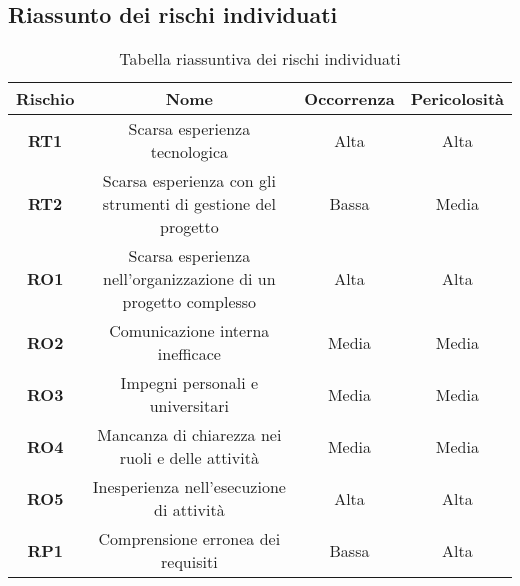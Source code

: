 \subsection{Riassunto dei rischi individuati}
\begin{table}[h]
\centering
\begin{tabular}{|c|c|c|c|}
\hline
\textbf{Rischio} & \textbf{Nome} & \textbf{Occorrenza} & \textbf{Pericolosità} \\
\hline
\textbf{RT1} & Scarsa esperienza tecnologica & Alta & Alta \\
\hline
\textbf{RT2} & Scarsa esperienza con gli strumenti di gestione del progetto & Bassa & Media \\
\hline
\textbf{RO1} & Scarsa esperienza nell’organizzazione di un progetto complesso & Alta & Alta \\
\hline
\textbf{RO2} & Comunicazione interna inefficace & Media & Media \\
\hline
\textbf{RO3} & Impegni personali e universitari & Media & Media \\
\hline
\textbf{RO4} & Mancanza di chiarezza nei ruoli e delle attività & Media & Media \\
\hline
\textbf{RO5} & Inesperienza nell'esecuzione di attività & Alta & Alta \\
\hline
\textbf{RP1} & Comprensione erronea dei requisiti & Bassa & Alta \\
\hline
\end{tabular}
\caption{Tabella riassuntiva dei rischi individuati}
\label{tab:rischi}
\end{table}